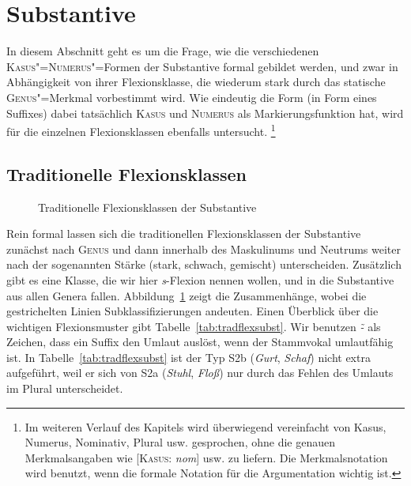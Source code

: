 \section{Substantive}

\label{sec:subst}

In diesem Abschnitt geht es um die Frage, wie die verschiedenen \textsc{Kasus}"=\textsc{Numerus}"=Formen der Substantive formal gebildet werden, und zwar in Abhängigkeit von ihrer Flexionsklasse, die wiederum stark durch das statische \textsc{Genus}"=Merkmal vorbestimmt wird.
Wie eindeutig die Form (\zB in Form eines Suffixes) dabei tatsächlich \textsc{Kasus} und \textsc{Numerus} als Markierungsfunktion hat, wird für die einzelnen Flexionsklassen ebenfalls untersucht.%
\footnote{Im weiteren Verlauf des Kapitels wird überwiegend vereinfacht von Kasus, Numerus, Nominativ, Plural usw. gesprochen, ohne die genauen Merkmalsangaben wie [\textsc{Kasus}: \textit{nom}] usw. zu liefern.
Die Merkmalsnotation wird benutzt, wenn die formale Notation für die Argumentation wichtig ist.}

\subsection{Traditionelle Flexionsklassen}

\label{sec:nominaflexionsklassen}

\begin{figure}[!h]
  \caption{Traditionelle Flexionsklassen der Substantive}
  \label{fig:substflexklassen}
\end{figure}

Rein formal lassen sich die traditionellen Flexionsklassen der Substantive zunächst nach \textsc{Genus} und dann innerhalb des Maskulinums und Neutrums weiter nach der sogenannten Stärke (stark, schwach, gemischt) unterscheiden.
Zusätzlich gibt es eine Klasse, die wir hier \textit{s}-Flexion nennen wollen, und in die Substantive aus allen Genera fallen.
Abbildung~\ref{fig:substflexklassen} zeigt die Zusammenhänge, wobei die gestrichelten Linien Subklassifizierungen andeuten.
Einen Überblick über die wichtigen Flexionsmuster gibt Tabelle~\ref{tab:tradflexsubst}.
Wir benutzen \textit{\~-} als Zeichen, dass ein Suffix den Umlaut auslöst, wenn der Stammvokal umlautfähig ist.
In Tabelle~\ref{tab:tradflexsubst} ist der Typ S2b (\textit{Gurt}, \textit{Schaf}) nicht extra aufgeführt, weil er sich von S2a (\textit{Stuhl}, \textit{Floß}) nur durch das Fehlen des Umlauts im Plural unterscheidet.

